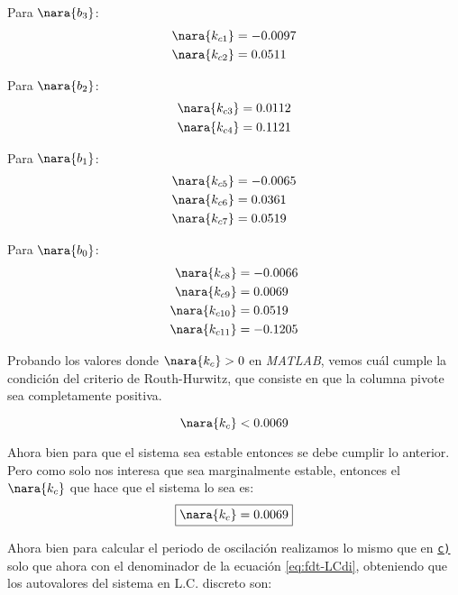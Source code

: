 \begin{multicols}{4}
    Para $\nara{b_3}$: 
    \begin{align}
        \nara{k_{c1}} & = -0.0097 \\
        \nara{k_{c2}} & = 0.0511
    \end{align}
    
    \columnbreak
    
    Para $\nara{b_2}$:
    \begin{align}
        \nara{k_{c3}} & = 0.0112 \\
        \nara{k_{c4}} & = 0.1121 \\
    \end{align}

    \columnbreak

    Para $\nara{b_1}$: 
    \begin{align}
        \nara{k_{c5}} & = -0.0065 \\
        \nara{k_{c6}} & = 0.0361 \\
        \nara{k_{c7}} & =   0.0519
    \end{align}
      
    \columnbreak

    Para $\nara{b_0}$: 
    \begin{align}
        \nara{k_{c8}} & = -0.0066 \\
        \nara{k_{c9}} & = 0.0069 \\
        \nara{k_{c10}} & = 0.0519 \\
        \nara{k_{c11}} & = -0.1205
    \end{align}

\end{multicols}

Probando los valores donde $\nara{k_{c}} > 0$ en \textit{MATLAB}, vemos cuál
cumple la condición del criterio de Routh-Hurwitz, que consiste en que la columna
pivote sea completamente positiva.

\begin{equation}
    \nara{k_{c}}  < 0.0069
\end{equation}

Ahora bien para que el sistema sea estable entonces se debe cumplir lo anterior. Pero 
como solo nos interesa que sea marginalmente estable, entonces el $\nara{k_{c}}$
que hace que el sistema lo sea es:
\begin{equation}
    \boxed{\nara{k_c} = 0.0069}
\end{equation}

Ahora bien para calcular el periodo de oscilación realizamos lo mismo que en
\hyperref[pregunta-c]{\texttt{c)}} solo que ahora con el denominador de la
ecuación \eqref{eq:fdt-LCdi}, obteniendo que los autovalores del sistema en L.C.
discreto son:

